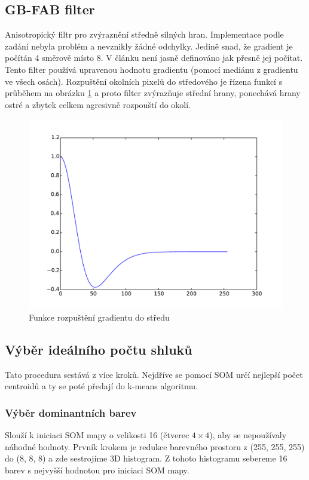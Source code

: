 \documentclass[fleqn,numbers=noenddot,headinclude,%
				11pt,a4paper,footinclude,%
				cleardoublepage=empty,abstractoff %
                ]{scrartcl}
\begin{document}
\subsection{GB-FAB filter}
\label{sub:gb-fab}
Anisotropický filtr pro zvýraznění středně silných hran. Implementace podle zadání nebyla problém a nevznikly žádné odchylky. Jedině snad, že gradient je počítán 4 směrově místo 8. V článku není jasně definováno jak přesně jej počítat.
Tento filter používá upravenou hodnotu gradientu (pomocí mediánu z gradientu ve všech osách). Rozpuštění okolních pixelů do středového je řízena funkcí s průběhem na obrázku \ref{img:gbfab} a proto filter zvýrazňuje střední hrany, ponechává hrany ostré a zbytek celkem agresivně rozpouští do okolí.
\begin{figure}[htp]
\centering
\includegraphics[width=\textwidth]{plots/dfab_function.pdf}
\caption{Funkce rozpuštění gradientu do středu}
\label{img:gbfab}
\end{figure}

\subsection{Výběr ideálního počtu shluků}
\label{sub:som}
Tato procedura sestává z více kroků. Nejdříve se pomocí SOM určí nejlepší počet centroidů a ty se poté předají do k-means algoritmu.

\subsubsection{Výběr dominantních barev} Slouží k iniciaci SOM mapy o velikosti 16 (čtverec $4\times4$), aby se nepoužívaly náhodné hodnoty. Prvník krokem je redukce barevného prostoru z (255, 255, 255) do (8, 8, 8) a zde sestrojíme 3D histogram. Z tohoto histogramu sebereme 16 barev s nejvyšší hodnotou pro iniciaci SOM mapy.
\end{document}
